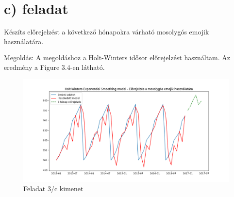 \documentclass[11pt,a4paper,oneside]{report}
\begin{document}
\section{c) feladat}
Készíts előrejelzést a következő hónapokra várható mosolygós emojik használatára.

Megoldás:
A megoldáshoz a Holt-Winters idősor előrejelzést használtam. Az eredmény a Figure 3.4-en látható.

\begin{figure}[!ht]
  \begin{center}
    \includegraphics[scale=0.4]{Figure_7.png}
    \caption{Feladat 3/c kimenet}
    \label{fig:TexnicCenter}
  \end{center}
\end{figure}
\end{document}
